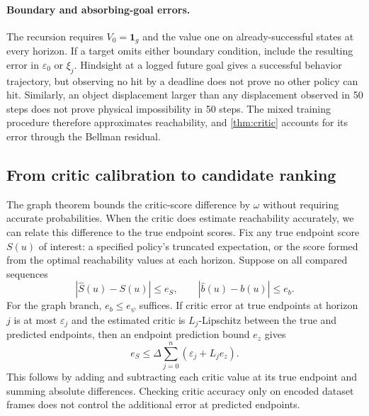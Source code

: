 \documentclass{article}
\newcommand{\ind}{\mathbf{1}}
\theoremstyle{definition}
\theoremstyle{remark}
\begin{document}
\paragraph{Boundary and absorbing-goal errors.}
The recursion requires $V_0=\ind_g$ and the value one on already-successful states
at every horizon. If a target omits either boundary condition, include the resulting
error in $\varepsilon_0$ or $\xi_j$.
Hindsight at a logged future goal gives a successful behavior trajectory, but observing
no hit by a deadline does not prove no other policy can hit.
Similarly, an object displacement larger than any displacement observed in 50 steps
does not prove physical impossibility in 50 steps.
The mixed training procedure therefore approximates reachability, and
\cref{thm:critic} accounts for its error through the Bellman residual.

\subsection{From critic calibration to candidate ranking}
\label{app:calibration}
The graph theorem bounds the critic-score difference by $\omega$ without requiring
accurate probabilities. When the critic does estimate reachability accurately,
we can relate this difference to the true endpoint scores.
Fix any true endpoint score $S(u)$ of interest: a specified policy's truncated
expectation, or the score formed from the optimal reachability values at each horizon.
Suppose on all compared sequences
\begin{equation}
 |\widehat S(u)-S(u)|\le e_S,\qquad
 |\widehat b(u)-b(u)|\le e_b .
 \label{eq:score-uniform}
\end{equation}
For the graph branch, $e_b\le e_\psi$ suffices.
If critic error at true endpoints at horizon $j$ is at most $\varepsilon_j$ and
the estimated critic is $L_j$-Lipschitz between the true and predicted endpoints,
then an endpoint prediction bound $e_z$ gives
\begin{equation}
 e_S\le\Delta\sum_{j=0}^{n}(\varepsilon_j+L_je_z).
 \label{eq:score-model-calibration}
\end{equation}
This follows by adding and subtracting each critic value at its true
endpoint and summing absolute differences. Checking critic accuracy only on encoded
dataset frames does not control the additional error at predicted endpoints.
\end{document}
